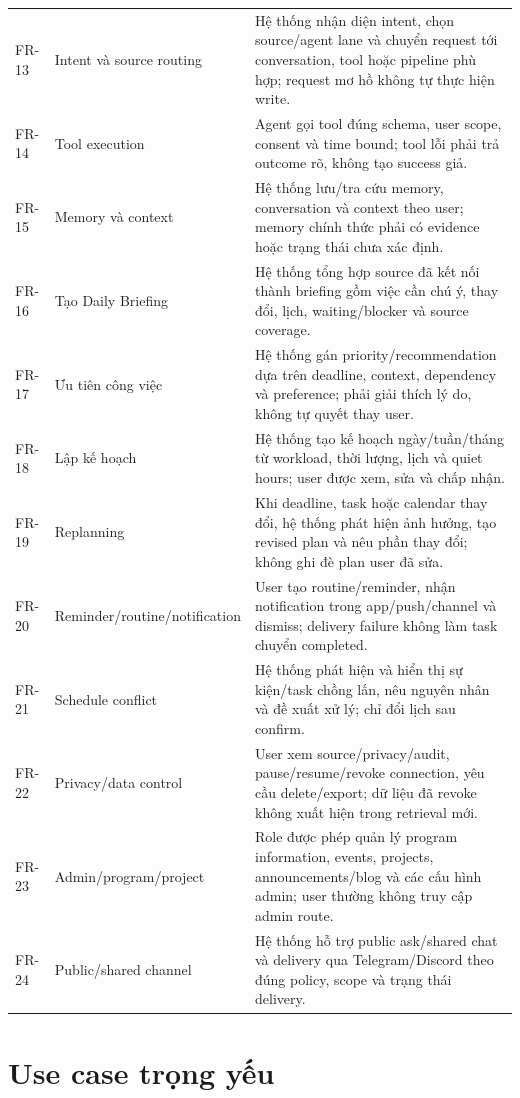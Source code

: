 \documentclass[12pt,a4paper]{article}
\begin{document}
\begin{longtable}{p{1.7cm}p{4cm}p{8.3cm}}
FR-13 & Intent và source routing & Hệ thống nhận diện intent, chọn source/agent lane và chuyển request tới conversation, tool hoặc pipeline phù hợp; request mơ hồ không tự thực hiện write. \\
FR-14 & Tool execution & Agent gọi tool đúng schema, user scope, consent và time bound; tool lỗi phải trả outcome rõ, không tạo success giả. \\
FR-15 & Memory và context & Hệ thống lưu/tra cứu memory, conversation và context theo user; memory chính thức phải có evidence hoặc trạng thái chưa xác định. \\
FR-16 & Tạo Daily Briefing & Hệ thống tổng hợp source đã kết nối thành briefing gồm việc cần chú ý, thay đổi, lịch, waiting/blocker và source coverage. \\
FR-17 & Ưu tiên công việc & Hệ thống gán priority/recommendation dựa trên deadline, context, dependency và preference; phải giải thích lý do, không tự quyết thay user. \\
FR-18 & Lập kế hoạch & Hệ thống tạo kế hoạch ngày/tuần/tháng từ workload, thời lượng, lịch và quiet hours; user được xem, sửa và chấp nhận. \\
FR-19 & Replanning & Khi deadline, task hoặc calendar thay đổi, hệ thống phát hiện ảnh hưởng, tạo revised plan và nêu phần thay đổi; không ghi đè plan user đã sửa. \\
FR-20 & Reminder/routine/notification & User tạo routine/reminder, nhận notification trong app/push/channel và dismiss; delivery failure không làm task chuyển completed. \\
FR-21 & Schedule conflict & Hệ thống phát hiện và hiển thị sự kiện/task chồng lấn, nêu nguyên nhân và đề xuất xử lý; chỉ đổi lịch sau confirm. \\
FR-22 & Privacy/data control & User xem source/privacy/audit, pause/resume/revoke connection, yêu cầu delete/export; dữ liệu đã revoke không xuất hiện trong retrieval mới. \\
FR-23 & Admin/program/project & Role được phép quản lý program information, events, projects, announcements/blog và các cấu hình admin; user thường không truy cập admin route. \\
FR-24 & Public/shared channel & Hệ thống hỗ trợ public ask/shared chat và delivery qua Telegram/Discord theo đúng policy, scope và trạng thái delivery. \\
\bottomrule
\end{longtable}

\section{Use case trọng yếu}
\end{document}
